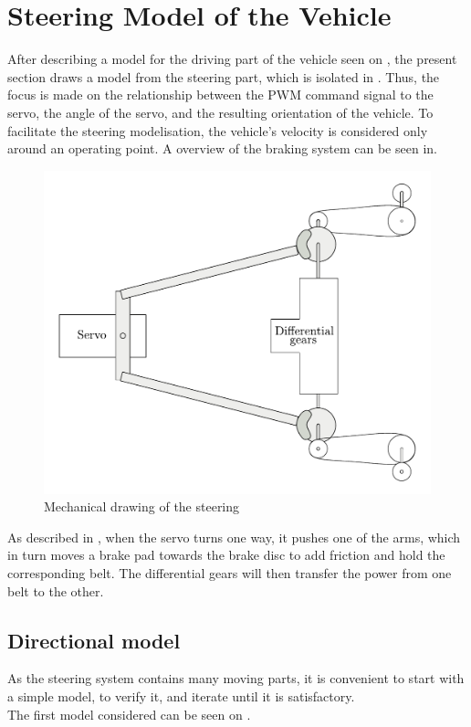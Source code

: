 \section{Steering Model of the Vehicle}\label{sec:SteeringModel}
After describing a model for the driving part of the vehicle seen on , the present section draws a model from the steering part, which is isolated in . Thus, the focus is made on the relationship between the PWM command signal to the servo, the angle of the servo, and the resulting orientation of the vehicle. To facilitate the steering modelisation, the vehicle's velocity is considered only around an operating point. A overview of the braking system can be seen in.

 \begin{figure}[H]
 	\centering
 	\includegraphics[scale=0.6]{figures/steeringMechanical.pdf}
 	\caption{Mechanical drawing of the steering}
 	\label{steeringMechanical}
 \end{figure}

As described in , when the servo turns one way, it pushes one of the arms, which in turn moves  a brake pad towards the brake disc to add friction and hold the corresponding belt. The differential gears will then transfer the power from one belt to the other.

\subsection{Directional model}
As the steering system contains many moving parts, it is convenient to start with a simple model, to verify it, and iterate until it is satisfactory.\\
%
The first model considered can be seen on .

